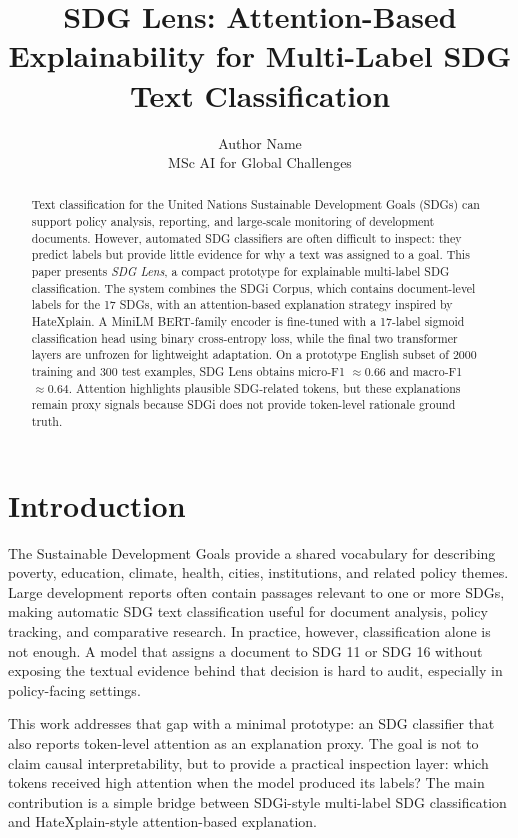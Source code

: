 \documentclass[10pt]{article}
\title{\vspace{-1.2em}SDG Lens: Attention-Based Explainability for Multi-Label SDG Text Classification}
\author{Author Name \\
MSc AI for Global Challenges}
\date{}
\begin{document}
\maketitle
\vspace{-1.6em}

\begin{abstract}
Text classification for the United Nations Sustainable Development Goals
(SDGs) can support policy analysis, reporting, and large-scale monitoring of
development documents. However, automated SDG classifiers are often difficult
to inspect: they predict labels but provide little evidence for why a text was
assigned to a goal. This paper presents \emph{SDG Lens}, a compact prototype
for explainable multi-label SDG classification. The system combines the SDGi
Corpus, which contains document-level labels for the 17 SDGs, with an
attention-based explanation strategy inspired by HateXplain. A MiniLM
BERT-family encoder is fine-tuned with a 17-label sigmoid classification head
using binary cross-entropy loss, while the final two transformer layers are
unfrozen for lightweight adaptation. On a prototype English subset of 2000
training and 300 test examples, SDG Lens obtains micro-F1 $\approx 0.66$ and
macro-F1 $\approx 0.64$. Attention highlights plausible SDG-related tokens, but
these explanations remain proxy signals because SDGi does not provide
token-level rationale ground truth.
\end{abstract}

\section{Introduction}
The Sustainable Development Goals provide a shared vocabulary for describing
poverty, education, climate, health, cities, institutions, and related policy
themes. Large development reports often contain passages relevant to one or
more SDGs, making automatic SDG text classification useful for document
analysis, policy tracking, and comparative research. In practice, however,
classification alone is not enough. A model that assigns a document to SDG 11
or SDG 16 without exposing the textual evidence behind that decision is hard to
audit, especially in policy-facing settings.

This work addresses that gap with a minimal prototype: an SDG classifier that
also reports token-level attention as an explanation proxy. The goal is not to
claim causal interpretability, but to provide a practical inspection layer:
which tokens received high attention when the model produced its labels? The
main contribution is a simple bridge between SDGi-style multi-label SDG
classification and HateXplain-style attention-based explanation.
\end{document}
